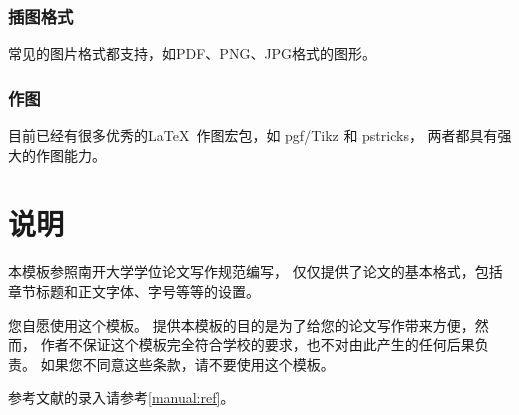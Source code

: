 \subsection{插图格式}

常见的图片格式都支持，如PDF、PNG、JPG格式的图形。



\subsection{作图}

目前已经有很多优秀的\LaTeX\ 作图宏包，如 pgf/Tikz 和 pstricks，
两者都具有强大的作图能力。

\chapter{说明}



本模板参照南开大学学位论文写作规范编写，
仅仅提供了论文的基本格式，包括章节标题和正文字体、字号等等的设置。



您自愿使用这个模板。
提供本模板的目的是为了给您的论文写作带来方便，然而，
作者不保证这个模板完全符合学校的要求，也不对由此产生的任何后果负责。
如果您不同意这些条款，请不要使用这个模板。


参考文献的录入请参考\ref{manual:ref}。 